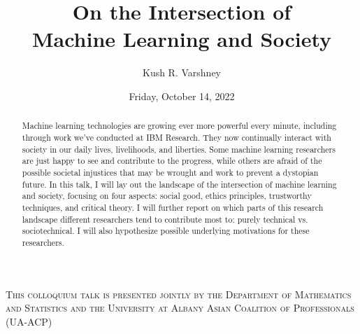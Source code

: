 \documentclass[colloquium]{UAmathtalk}
\author{Kush R. Varshney}
\title{On the Intersection of\\ Machine Learning and Society}
\date{Friday, October 14, 2022}
\begin{document}
\maketitle

\begin{abstract}
Machine learning technologies are growing ever more powerful every minute, including through work we’ve conducted at IBM Research. They now continually interact with society in our daily lives, livelihoods, and liberties. Some machine learning researchers are just happy to see and contribute to the progress, while others are afraid of the possible societal injustices that may be wrought and work to prevent a dystopian future. In this talk, I will lay out the landscape of the intersection of machine learning and society, focusing on four aspects: social good, ethics principles, trustworthy techniques, and critical theory. I will further report on which parts of this research landscape different researchers tend to contribute most to: purely technical vs. sociotechnical. I will also hypothesize possible underlying motivations for these researchers.
\end{abstract}

\vfill\noindent\textsc{\large This colloquium talk is presented jointly by the Department of Mathematics and Statistics and the University at Albany Asian Coalition of Professionals (UA-ACP)}
\end{document}
